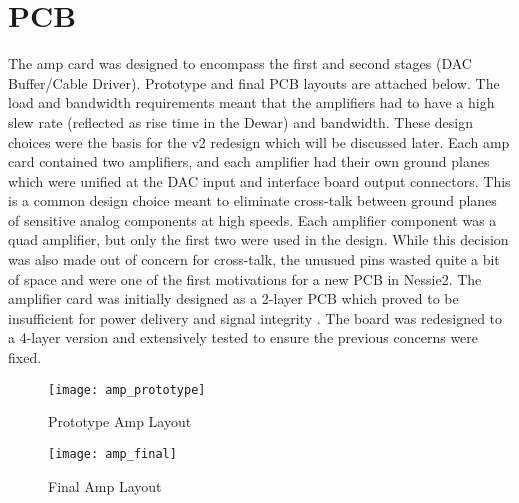 \section{PCB}
The amp card was designed to encompass the first and second stages (DAC Buffer/Cable Driver). Prototype and final PCB layouts are attached below. The load and bandwidth requirements meant that the amplifiers had to have a high slew rate (reflected as rise time in the Dewar) and bandwidth. These design choices were the basis for the v2 redesign which will be discussed later. Each amp card contained two amplifiers, and each amplifier had their own ground planes which were unified at the DAC input and interface board output connectors. This is a common design choice meant to eliminate cross-talk between ground planes of sensitive analog components at high speeds. Each amplifier component was a quad amplifier, but only the first two were used in the design. While this decision was also made out of concern for cross-talk, the unusued pins wasted quite a bit of space and were one of the first motivations for a new PCB in Nessie2. The amplifier card was initially designed as a 2-layer PCB which proved to be insufficient for power delivery and signal integrity \cite{marks}. The board was redesigned to a 4-layer version and extensively tested to ensure the previous concerns were fixed. \par
\begin{figure}[!htb]
	\texttt{[image: amp\_prototype]}
	\centering
	\caption{Prototype Amp Layout}
	\centering
\end{figure}
\begin{figure}[!htb]
	\texttt{[image: amp\_final]}
	\centering
	\caption{Final Amp Layout}
	\centering
\end{figure}

